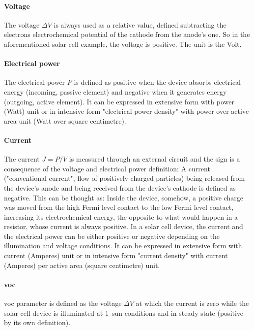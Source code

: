 \paragraph{Voltage} The voltage $\Delta V$ is always used as a relative value, defined subtracting the electrons electrochemical potential of the cathode from the anode's one. So in the aforementioned solar cell example, the voltage is positive. The unit is the Volt.

\paragraph{Electrical power} The electrical power $P$ is defined as positive when the device absorbs electrical energy (incoming, passive element) and negative when it generates energy (outgoing, active element). It can be expressed in extensive form with power (Watt) unit or in intensive form "electrical power density" with power over active area unit (Watt over square centimetre).

\paragraph{Current} The current $J=P/V$ is measured through an external circuit and the sign is a consequence of the voltage and electrical power definition: A current ("conventional current", flow of positively charged particles) being released from the device's anode and being received from the device's cathode is defined as negative. This can be thought as: Inside the device, somehow, a positive charge was moved from the high Fermi level contact to the low Fermi level contact, increasing its electrochemical energy, the opposite to what would happen in a resistor, whose current is always positive. In a solar cell device, the current and the electrical power can be either positive or negative depending on the illumination and voltage conditions. It can be expressed in extensive form with current (Amperes) unit or in intensive form "current density" with current (Amperes) per active area (square centimetre) unit.

\paragraph{\Glsdesc{voc}} \Gls{voc} parameter is defined as the voltage $\Delta V$ at which the current is zero while the solar cell device is illuminated at 1~sun conditions and in steady state (positive by its own definition).

